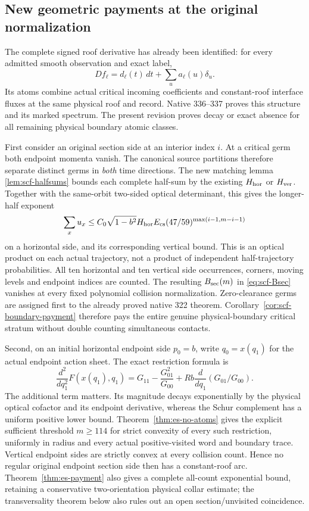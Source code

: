 \subsection*{New geometric payments at the original normalization}
The complete signed roof derivative has already been identified:
for every admitted smooth observation and exact label,
\[
 Df_\ell=d_\ell(t)\,dt+\sum_u a_\ell(u)\delta_u.
\]
Its atoms combine actual critical incoming coefficients and
constant-roof interface fluxes at the same physical roof and
record. Native 336--337 proves this structure and its marked
spectrum. The present revision proves decay or exact absence
for all remaining physical boundary atomic classes.

First consider an original section side at an interior index
$i$. At a critical germ both endpoint momenta vanish. The
canonical source partitions therefore separate distinct germs
in \emph{both} time directions. The new matching lemma
\ref{lem:scf-halfsums} bounds each complete half-sum by the
existing $H_{\rm hor}$ or $H_{\rm ver}$. Together with the
same-orbit two-sided optical determinant, this gives the
longer-half exponent
\[
 \sum_xu_x\le C_0\sqrt{1-b^2}H_{\rm hor}E_{\rm cs}
          (47/59)^{\max(i-1,m-i-1)}
\]
on a horizontal side, and its corresponding vertical bound.
This is an optical product on each actual trajectory, not a
product of independent half-trajectory probabilities.
All ten horizontal and ten vertical side occurrences,
corners, moving levels and endpoint indices are counted.
The resulting $B_{\rm sec}(m)$ in \eqref{eq:scf-Bsec}
vanishes at every fixed polynomial collision normalization.
Zero-clearance germs are assigned first to the already proved
native 322 theorem. Corollary~\ref{cor:scf-boundary-payment}
therefore pays the entire genuine physical-boundary critical
stratum without double counting simultaneous contacts.

Second, on an initial horizontal endpoint side $p_0=b$, write
$q_0=x(q_1)$ for the actual endpoint action sheet. The exact
restriction formula is
\[
 \frac{d^2}{dq_1^2}F(x(q_1),q_1)
       =G_{11}-\frac{G_{01}^2}{G_{00}}
                  +Rb\frac{d}{dq_1}(G_{01}/G_{00}).
\]
The additional term matters. Its magnitude decays exponentially
by the physical optical cofactor and its endpoint derivative,
whereas the Schur complement has a uniform positive lower bound.
Theorem~\ref{thm:es-no-atoms} gives the explicit sufficient
threshold $m\ge114$ for strict convexity of every such
restriction, uniformly in radius and every actual positive-visited
word and boundary trace. Vertical endpoint sides are strictly
convex at every collision count. Hence no regular original
endpoint section side then has a constant-roof arc.
Theorem~\ref{thm:es-payment} also gives a complete all-count
exponential bound, retaining a conservative two-orientation
physical collar estimate; the transversality theorem below
also rules out an open section/unvisited coincidence.


